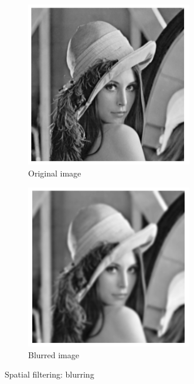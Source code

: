 \begin{figure}[h!]
\centering
\begin{subfigure}[]{0.4\textwidth}
\centering
\includegraphics[width=0.8\textwidth]{./img/lena.png}
\caption{\small{Original image}}
\label{fig:lbO}
\end{subfigure}%
\begin{subfigure}[]{0.4\textwidth}
\centering
\includegraphics[width=0.8\textwidth]{./img/blur.png}
\caption{\small{Blurred image}}
\label{fig:blI}
\end{subfigure}%
\caption{\small{Spatial filtering: blurring}\label{bl}}
\end{figure}

